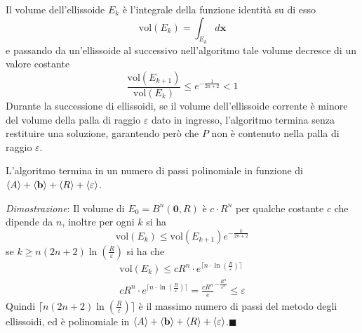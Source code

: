 \documentclass[10pt, letterpaper]{report}
\newcommand{\bb}{{\mathbf{b}}}
\newcommand{\x}{{\mathbf{x}}}
\begin{document}
\noindent Il volume dell'ellissoide $E_k$ è l'integrale della funzione identità su di esso 
$$ \text{vol}(E_k)=\int_{E_k}d\x$$
e passando da un'ellissoide al successivo nell'algoritmo tale volume decresce di un valore costante 
$$ 
\frac{\text{vol}(E_{k+1})}{\text{vol}(E_{k})}\le e^{-\frac{1}{2n+2}}<1
$$
Durante la successione di ellissoidi, se il volume dell'ellissoide corrente è minore del volume della palla di raggio $\varepsilon$ dato in ingresso, l'algoritmo termina senza restituire una soluzione, garantendo però che $P$ non è contenuto nella palla di raggio $\varepsilon$.
\begin{proposizione}
    L'algoritmo termina in un numero di passi polinomiale in funzione di $\bra A+\bra \bb+\bra R+\bra \varepsilon$.
\end{proposizione}
\textit{Dimostrazione}:  Il volume di $E_0=B^n(\mathbf 0,R)$ è $c\cdot R^n$ per qualche costante $c$ che dipende da $n$, inoltre per ogni $k$ si ha 
$$ \text{vol}(E_k)\le \text{vol}(E_{k+1})e^{-\frac{k}{2n+2}}$$
se $k\ge n(2n+2)\ln(\frac{R}{\varepsilon})$ si ha che 
\begin{eqnarray}
    \text{vol}(E_k)\le cR^n\cdot e^{\lceil n\cdot\ln(\frac{R}{\varepsilon}) \rceil}\\ 
    cR^n\cdot e^{\lceil n\cdot\ln(\frac{R}{\varepsilon}) \rceil}=\frac{cR^n}e^{-\frac{R^n}{\varepsilon^n}}\le \varepsilon
\end{eqnarray}
Quindi $\lceil n(2n+2)\ln(\frac{R}{\varepsilon})\rceil$ è il massimo numero di passi del metodo degli ellissoidi, ed è polinomiale in $\bra A+\bra \bb+\bra R+\bra \varepsilon$.\hfill$\blacksquare$
\end{document}
